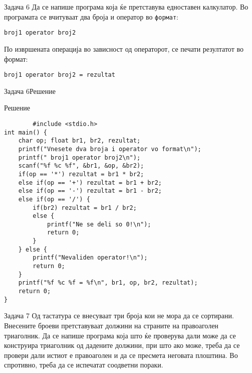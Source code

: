 \begin{frame}[fragile]{Задача 6}
Да се напише програма која ќе претставува едноставен калкулатор. Во програмата
се вчитуваат два броја и оператор во \texttt{формат}:
\begin{center}
\texttt{broj1 operator broj2}
\end{center}
По извршената операција во зависност од операторот, се печати резултатот во формат:
\begin{center}
\texttt{broj1 operator broj2 = rezultat}
\end{center}
\end{frame}

\begin{frame}[fragile,shrink=10]{Задача 6}{Решение}
	\begin{exampleblock}{Решение}
		\begin{lstlisting}
		#include <stdio.h>
int main() {
    char op; float br1, br2, rezultat;
    printf("Vnesete dva broja i operator vo format\n");
    printf(" broj1 operator broj2\n");
    scanf("%f %c %f", &br1, &op, &br2);
    if(op == '*') rezultat = br1 * br2;
    else if(op == '+') rezultat = br1 + br2;
    else if(op == '-') rezultat = br1 - br2;
    else if(op == '/') {
        if(br2) rezultat = br1 / br2;
        else {
            printf("Ne se deli so 0!\n");
            return 0;
        }
    } else {
        printf("Nevaliden operator!\n");
        return 0;
    }
    printf("%f %c %f = %f\n", br1, op, br2, rezultat);
    return 0;
}
		\end{lstlisting}
	\end{exampleblock}
\end{frame}


\begin{frame}[fragile]{Задача 7}
Од тастатура се внесуваат три броја кои не мора да се сортирани. Внесените броеви претставуваат должини на страните на правоаголен триаголник. Да се напише програма која што ќе проверува дали може да се конструира триаголник од дадените должини, при што ако може, треба да се провери дали истиот е правоаголен и да се пресмета неговата плоштина. Во спротивно, треба да се испечатат соодветни пораки.
\end{frame}



